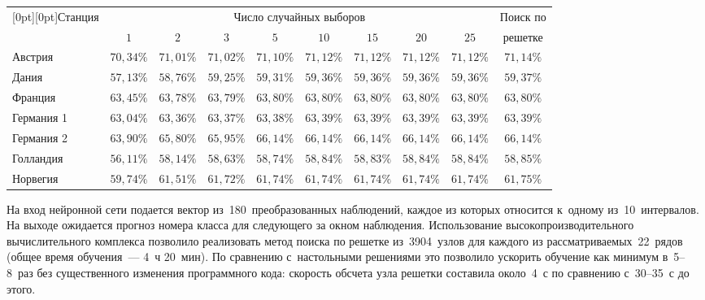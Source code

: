 \begin{multicols}{2}
\begin{table*}
\begin{center}
\tabcolsep=7.8pt
\begin{tabular}{|l|c|c|c|c|c|c|c|c|c|}
\hline
\multicolumn{1}{|c|}{\raisebox{-6pt}[0pt][0pt]{Станция}}&
\multicolumn{8}{c|}{Число случайных выборов}&{Поиск по} \\
\cline{2-9}
&$1$&$2$&$3$&$5$&$10$&$15$&$20$&$25$&{решетке}\\
\hline
Австрия&$70{,}34\%$ &$71{,}01\%$    &$71{,}02\%$    &$71{,}10\%$    &$71{,}12\%$     &$71{,}12\%$   &$71{,}12\%$    &$71{,}12\%$    &$71{,}14\%$\\
Дания&$57{,}13\%$   &$58{,}76\%$&   $59{,}25\%$ &$59{,}31\%$    &$59{,}36\%$     
&$59{,}36\%$   &$59{{,}}36\%$  &$59{,}36\%$    &$59{,}37\%$\\
Франция&$63{,}45\%$ &$63{,}78\%$    &$63{,}79\%$    &$63{,}80\%$    &$63{,}80\%$     &$63{,}80\%$   &$63{,}80\%$    &$63{,}80\%$    &$63{,}80\%$\\
Германия 1&$63{,}04\%$  &$63{,}36\%$    &$63{,}37\%$        &$63{,}38\%$    &$63{,}39\%$     &$63{,}39\%$   &$63{,}39\%$    &$63{,}39\%$    &$63{,}39\%$\\
Германия 2&$63{,}90\%$  &$65{,}80\%$&   $65{,}95\%$ &$66{,}14\%$    &$66{,}14\%$     &$66{,}14\%$   &$66{,}14\%$    &$66{,}14\%$    &$66{,}14\%$\\
Голландия&$56{,}11\%$   &$58{,}14\%$    &$58{,}63\%$    &$58{,}74\%$    &$58{,}84\%$     &$58{,}83\%$   &$58{,}84\%$    &$58{,}84\%$    &$58{,}85\%$\\
Норвегия&$59{,}74\%$    &$61{,}51\%$    &$61{,}72\%$        &$61{,}74\%$    &$61{,}74\%$     &$61{,}74\%$   &$61{,}74\%$    &$61{,}74\%$    &$61,75\%$\\
\hline
\end{tabular}
\end{center}
\vspace*{-3pt}
\end{table*}


На вход нейронной сети подается вектор из~180~преобразованных наблюдений, каждое 
из которых относится к~одному из~10~интервалов. На выходе ожидается прогноз 
номера класса для следующего за окном наблюдения. Использование 
высокопроизводительного вычислительного комплекса позволило 
реализовать метод поиска по решетке из~3904~узлов для каждого из 
рас\-смат\-ри\-ва\-емых~22~рядов 
(общее время обучения~--- 4~ч 20~мин). По сравнению с~настольными решениями 
это позволило ускорить обучение как минимум в~5--8~раз без существенного изменения 
программного кода: скорость обсчета узла решетки составила около~4~с 
по сравнению с~30--35~с до этого.



\end{multicols}
